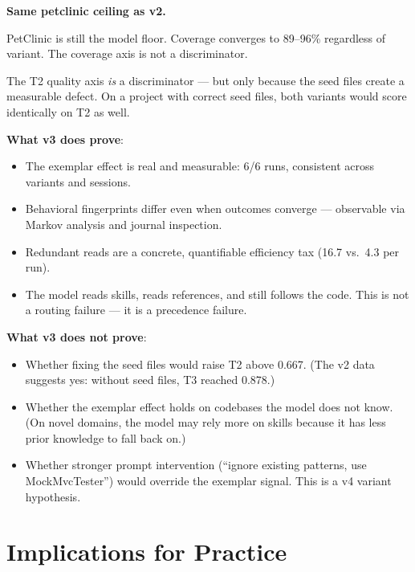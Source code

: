\documentclass[11pt,a4paper]{article}
\begin{document}
\begin{warningbox}
\textbf{Same petclinic ceiling as v2.}

PetClinic is still the model floor. Coverage converges to 89--96\%
regardless of variant. The coverage axis is not a discriminator.

The T2 quality axis \emph{is} a discriminator --- but only because the seed files
create a measurable defect. On a project with correct seed files,
both variants would score identically on T2 as well.
\end{warningbox}

\textbf{What v3 does prove}:
\begin{itemize}
  \item The exemplar effect is real and measurable: 6/6 runs,
    consistent across variants and sessions.
  \item Behavioral fingerprints differ even when outcomes converge ---
    observable via Markov analysis and journal inspection.
  \item Redundant reads are a concrete, quantifiable efficiency tax
    (16.7 vs.\ 4.3 per run).
  \item The model reads skills, reads references, and still follows
    the code. This is not a routing failure --- it is a precedence failure.
\end{itemize}

\textbf{What v3 does not prove}:
\begin{itemize}
  \item Whether fixing the seed files would raise T2 above 0.667.
    (The v2 data suggests yes: without seed files, T3 reached 0.878.)
  \item Whether the exemplar effect holds on codebases the model
    does not know. (On novel domains, the model may rely more on skills
    because it has less prior knowledge to fall back on.)
  \item Whether stronger prompt intervention (``ignore existing patterns,
    use MockMvcTester'') would override the exemplar signal.
    This is a v4 variant hypothesis.
\end{itemize}

\section{Implications for Practice}
\label{sec:implications}
\end{document}
